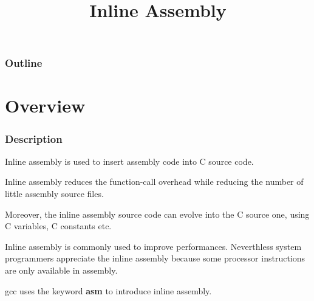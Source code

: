 %
%
%
%
%
%

%
%

%
%

\def\path{../..}

%
%



%
%

\title{Inline Assembly}

%
%



%
%

\begin{frame}
  \titlepage
\end{frame}

%
%

\begin{frame}
  \frametitle{Outline}

  \tableofcontents
\end{frame}

%
%

\section{Overview}


\begin{frame}
  \frametitle{Description}

  Inline assembly is used to insert assembly code into C source code.

  \-

  Inline assembly reduces the function-call overhead while reducing
  the number of little assembly source files.

  \-

  Moreover, the inline assembly source code can evolve into the C
  source one, using C variables, C constants etc.

  \-

  Inline assembly is commonly used to improve performances. Neverthless
  system programmers appreciate the inline assembly because some
  processor instructions are only available in assembly.

  \-

  gcc uses the keyword \textbf{asm} to introduce inline assembly.
\end{frame}

